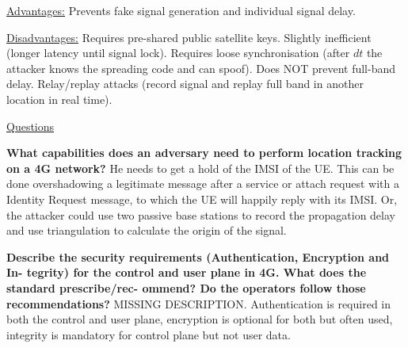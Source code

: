 \underline{Advantages:}
Prevents fake signal generation and individual signal delay.

\underline{Disadvantages:}
Requires pre-shared public satellite keys.
Slightly inefficient (longer latency until signal lock).
Requires loose synchronisation (after $dt$ the attacker knows the spreading code and can spoof).
Does NOT prevent full-band delay.
Relay/replay attacks (record signal and replay full band in another location in real time).

\underline{Questions}

\textbf{What capabilities does an adversary need to perform location tracking on a 4G network?} He needs to get a hold of the IMSI of the UE. This can be done overshadowing a legitimate message after a service or attach request with a Identity Request message, to which the UE will happily reply with its IMSI. Or, the attacker could use two passive base stations to record the propagation delay and use triangulation to calculate the origin of the signal.

\textbf{Describe the security requirements (Authentication, Encryption and In- tegrity) for the control and user plane in 4G. What does the standard prescribe/rec- ommend? Do the operators follow those recommendations?} MISSING DESCRIPTION. Authentication is required in both the control and user plane, encryption is optional for both but often used, integrity is mandatory for control plane but not user data. 

